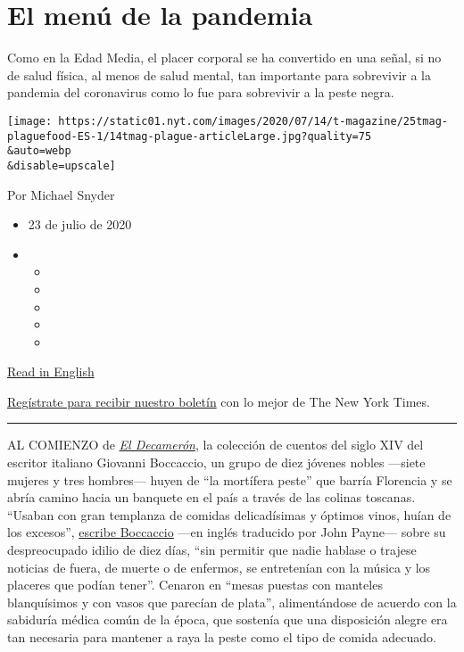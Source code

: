 \hypertarget{el-menuxfa-de-la-pandemia}{%
\section{El menú de la pandemia}\label{el-menuxfa-de-la-pandemia}}

Como en la Edad Media, el placer corporal se ha convertido en una señal,
si no de salud física, al menos de salud mental, tan importante para
sobrevivir a la pandemia del coronavirus como lo fue para sobrevivir a
la peste negra.

\texttt{[image: https://static01.nyt.com/images/2020/07/14/t-magazine/25tmag-plaguefood-ES-1/14tmag-plague-articleLarge.jpg?quality=75\\\&auto=webp\\\&disable=upscale]}

Por Michael Snyder

\begin{itemize}
\item
  23 de julio de 2020
\item
  \begin{itemize}
  \item
  \item
  \item
  \item
  \item
  \end{itemize}
\end{itemize}

\href{https://www.nytimes.com/2020/07/16/t-magazine/eating-food-during-plague.html}{Read
in English}

\href{https://www.nytimes.com/newsletters/el-times}{Regístrate para
recibir nuestro boletín} con lo mejor de The New York Times.

\begin{center}\rule{0.5\linewidth}{\linethickness}\end{center}

AL COMIENZO de
\href{https://www.nytimes.com/interactive/2020/07/07/magazine/decameron-project-short-story-collection.html}{\emph{El
Decamerón}}, la colección de cuentos del siglo XIV del escritor italiano
Giovanni Boccaccio, un grupo de diez jóvenes nobles ---siete mujeres y
tres hombres--- huyen de ``la mortífera peste'' que barría Florencia y
se abría camino hacia un banquete en el país a través de las colinas
toscanas. ``Usaban con gran templanza de comidas delicadísimas y óptimos
vinos, huían de los excesos'',
\href{https://www.alianzaeditorial.es/primer_capitulo/decameron.pdf}{escribe
Boccaccio} ---en inglés traducido por John Payne--- sobre su
despreocupado idilio de diez días, ``sin permitir que nadie hablase o
trajese noticias de fuera, de muerte o de enfermos, se entretenían con
la música y los placeres que podían tener''. Cenaron en ``mesas puestas
con manteles blanquísimos y con vasos que parecían de plata'',
alimentándose de acuerdo con la sabiduría médica común de la época, que
sostenía que una disposición alegre era tan necesaria para mantener a
raya la peste como el tipo de comida adecuado.

